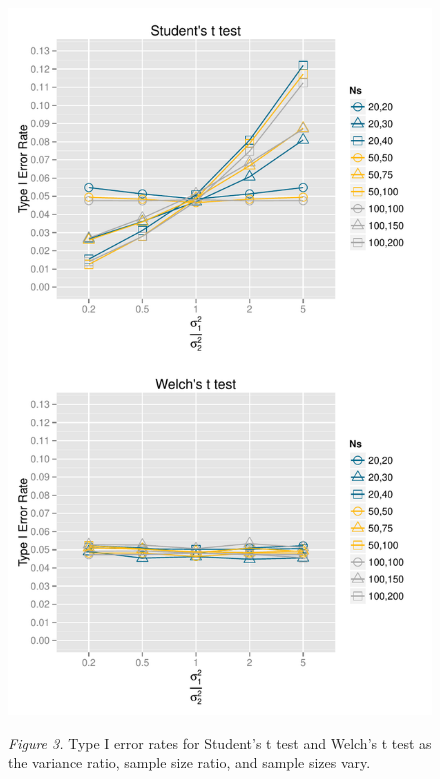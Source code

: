 \documentclass[man,a4paper,noextraspace,apacite]{apa6}
\begin{document}
\begin{figure}    
\includegraphics{WelchManuscript-MASTER-Type1ClassicPlot}

\textit{Figure 3.} Type I error rates for Student's t test and Welch's t test as the variance ratio, sample size ratio, and sample sizes vary.
\end{figure}


\end{document}
